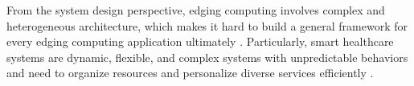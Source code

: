 \documentclass[letterpaper]{article} %
\begin{document}
From the system design perspective, edging computing involves complex and heterogeneous architecture, which makes it hard to build a general framework for every edging computing application ultimately \cite{krishnasamy2020edge}. Particularly, smart healthcare systems are dynamic, flexible, and complex systems with unpredictable behaviors and need to organize resources and personalize diverse services efficiently \cite{oueida2018edge}. 






\end{document}
